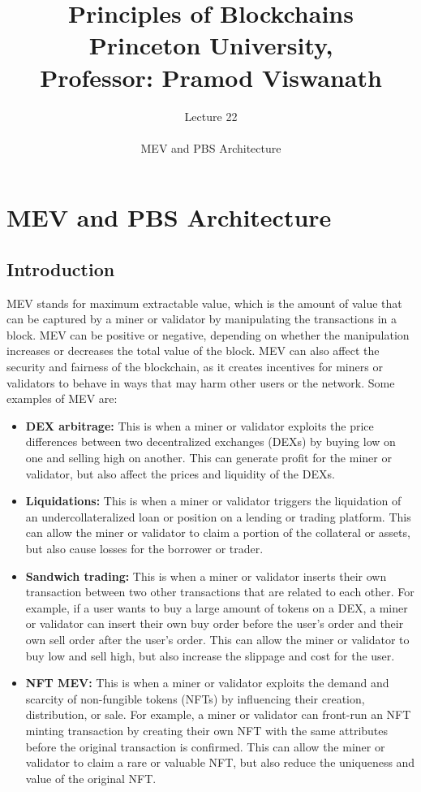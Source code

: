 \documentclass{report}
\title{\Huge{Principles of Blockchains \\ Princeton University,\\
		Professor: Pramod Viswanath}}
\author{\huge{Lecture 22} \\\\ MEV and PBS Architecture}
\begin{document}
\maketitle
\newpage%
\tableofcontents
\pagebreak

\chapter{MEV and PBS Architecture}
\section{Introduction}
MEV stands for maximum extractable value, which is the amount of value that can be captured by a miner or validator by manipulating the transactions in a block. MEV can be positive or negative, depending on whether the manipulation increases or decreases the total value of the block. MEV can also affect the security and fairness of the blockchain, as it creates incentives for miners or validators to behave in ways that may harm other users or the network.
Some examples of MEV are:
\begin{itemize}
	\item \textbf{DEX arbitrage:} This is when a miner or validator exploits the price differences between two decentralized exchanges (DEXs) by buying low on one and selling high on another. This can generate profit for the miner or validator, but also affect the prices and liquidity of the DEXs.
	\item \textbf{Liquidations:} This is when a miner or validator triggers the liquidation of an undercollateralized loan or position on a lending or trading platform. This can allow the miner or validator to claim a portion of the collateral or assets, but also cause losses for the borrower or trader.
	\item \textbf{Sandwich trading:} This is when a miner or validator inserts their own transaction between two other transactions that are related to each other. For example, if a user wants to buy a large amount of tokens on a DEX, a miner or validator can insert their own buy order before the user’s order and their own sell order after the user’s order. This can allow the miner or validator to buy low and sell high, but also increase the slippage and cost for the user.
	\item \textbf{NFT MEV:} This is when a miner or validator exploits the demand and scarcity of non-fungible tokens (NFTs) by influencing their creation, distribution, or sale. For example, a miner or validator can front-run an NFT minting transaction by creating their own NFT with the same attributes before the original transaction is confirmed. This can allow the miner or validator to claim a rare or valuable NFT, but also reduce the uniqueness and value of the original NFT.
\end{itemize}
\end{document}
